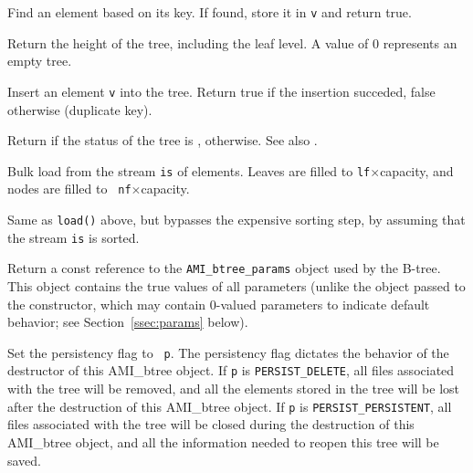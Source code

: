     {Find an element based on
   its key. If found, store it in {\tt v} and return true.}

    {Return the height of the tree, including
   the leaf level. A value of $0$ represents an empty tree.}

    {Insert an element {\tt v} into the
   tree. Return true if the insertion succeded, false otherwise (duplicate
   key).}

    {Return  if the status
   of the tree is , 
   otherwise. See also .}

    {Bulk load from the stream {\tt is} of elements. Leaves
   are filled to {\tt lf}$\times$capacity, and nodes are filled to {\tt
   nf}$\times$capacity.}


    {Same as {\tt load()} above, but bypasses the
   expensive sorting step, by assuming that the stream {\tt is} is sorted.}

    {Return a const
   reference to the {\tt AMI\_btree\_params} object used by the B-tree. This
   object contains the true values of all parameters (unlike the object
   passed to the constructor, which may contain $0$-valued parameters to
   indicate default behavior; see Section~\ref{ssec:params} below).}

    {Set the persistency flag to {\tt
   p}. The persistency flag dictates the behavior of the destructor of
   this AMI\_btree object. If {\tt p} is {\tt PERSIST\_DELETE}, all files
   associated with the tree will be removed, and all the elements stored in
   the tree will be lost after the destruction of this AMI\_btree object. If
   {\tt p} is {\tt PERSIST\_PERSISTENT}, all files associated with the tree
   will be closed during the destruction of this AMI\_btree object, and all the
   information needed to reopen this tree will be saved.}

